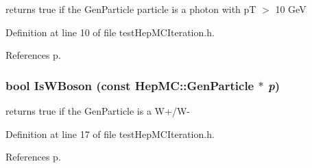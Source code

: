returns true if the Gen\-Particle particle is a photon with p\-T $>$ 10 Ge\-V 



Definition at line 10 of file test\-Hep\-MCIteration.h.

References p.
\subsubsection{\setlength{\rightskip}{0pt plus 5cm}bool Is\-WBoson (const {\bf Hep\-MC::Gen\-Particle} $\ast$ {\em p})}\label{testHepMCIteration_8h_d5e504a8f4b841a5b16c7ab9ccc76178}


returns true if the Gen\-Particle is a W+/W- 



Definition at line 17 of file test\-Hep\-MCIteration.h.

References p.